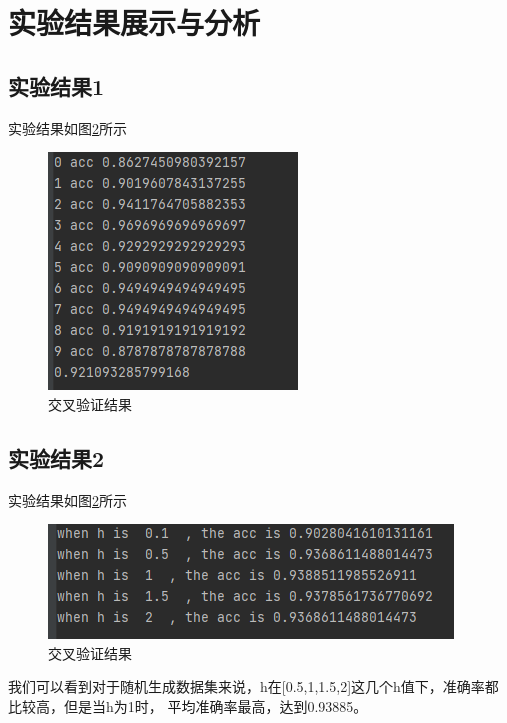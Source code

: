 \documentclass[UTF8,a4paper,10pt]{ctexart}
\begin{document}
\section{实验结果展示与分析}

\subsection{实验结果1}
实验结果如图\ref{fig:1}所示
\begin{figure}[H]
    \centering
    \includegraphics[scale=0.7]{1.png}
    \caption{交叉验证结果}
    \label{fig:1}
\end{figure}

\subsection{实验结果2}

实验结果如图\ref{fig:1}所示
\begin{figure}[H]
    \centering
    \includegraphics[scale=0.7]{2.png}
    \caption{交叉验证结果}
    \label{fig:1}
\end{figure}

我们可以看到对于随机生成数据集来说，h在[0.5,1,1.5,2]这几个h值下，准确率都比较高，但是当h为1时，
平均准确率最高，达到0.93885。



\end{document}

